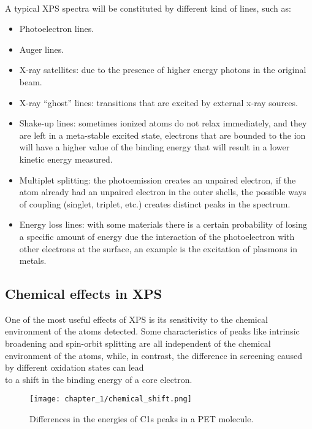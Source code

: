 \\
A typical XPS spectra will be constituted by different kind of lines, such as:
\begin{itemize}
    \item Photoelectron lines.
    \item Auger lines.
    \item X-ray satellites: due to the presence of higher energy photons in the original beam.
    \item X-ray “ghost” lines: transitions that are excited by external x-ray sources.
    \item Shake-up lines: sometimes ionized atoms do not relax immediately, and they are left in a meta-stable excited state, electrons that are bounded to the ion will have a higher value of the binding energy that will result in a lower kinetic energy measured.
    \item Multiplet splitting: the photoemission creates an unpaired electron, if the atom already had an unpaired electron in the outer shells, the possible ways of coupling (singlet, triplet, etc.) creates distinct peaks in the spectrum.
    \item Energy loss lines: with some materials there is a certain probability of losing a specific amount of energy due the interaction of the photoelectron with other electrons at the surface, an example is the excitation of plasmons in metals.
\end{itemize}
\subsection{Chemical effects in XPS}
\label{subsec:chemical_eff_xps}
One of the most useful effects of XPS is its sensitivity to the chemical environment of the atoms detected. Some characteristics of peaks like intrinsic broadening and spin-orbit splitting are all independent of the chemical environment of the atoms, while, in contrast, the difference in screening caused by different oxidation states can lead 
\\
to a shift in the binding energy of a core electron.
\begin{figure}[H]
    \centering
    \texttt{[image: chapter\_1/chemical\_shift.png]}
    \vspace*{-10pt}
    \caption{Differences in the energies of C1s peaks in a PET molecule. }
    \label{fig:chemical_shift}
\end{figure}

